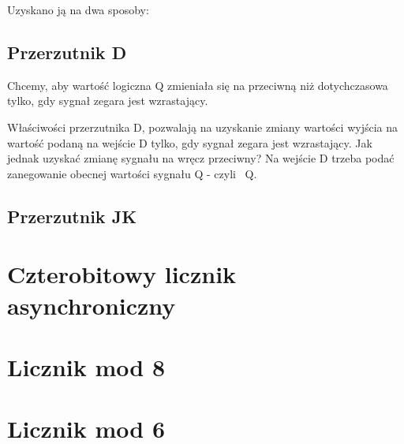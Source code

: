 \documentclass[12pt,a4paper]{article}
\begin{document}
Uzyskano ją na dwa sposoby:

\subsection{Przerzutnik D}

Chcemy, aby wartość logiczna Q zmieniała się na przeciwną niż dotychczasowa tylko, gdy sygnał zegara jest wzrastający.

Właściwości przerzutnika D, pozwalają na uzyskanie zmiany wartości wyjścia na wartość podaną na wejście D tylko, gdy sygnał zegara jest wzrastający. Jak jednak uzyskać zmianę sygnału na wręcz przeciwny? 
Na wejście D trzeba podać zanegowanie obecnej wartości sygnału Q - czyli ~Q.



\subsection{Przerzutnik JK}


\section{Czterobitowy licznik asynchroniczny}

\section{Licznik mod 8}

\section{Licznik mod 6}
\end{document}
